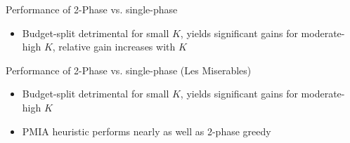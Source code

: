 \documentclass{beamer}
\begin{document}
\begin{frame}{Performance of 2-Phase vs. single-phase}
  \begin{center}
  \end{center}
  \begin{itemize}  
  	\item Budget-split detrimental for small $K$, yields significant gains for moderate-high $K$, relative gain increases with $K$
      
  \end{itemize}
\end{frame}

\begin{frame}{Performance of 2-Phase vs. single-phase (Les Miserables)}
  \begin{center}
  \end{center}
  \begin{itemize}  
  	\item Budget-split detrimental for small $K$, yields significant gains for moderate-high $K$
    \item PMIA heuristic performs nearly as well as 2-phase greedy
    
  \end{itemize}
\end{frame}
\end{document}
